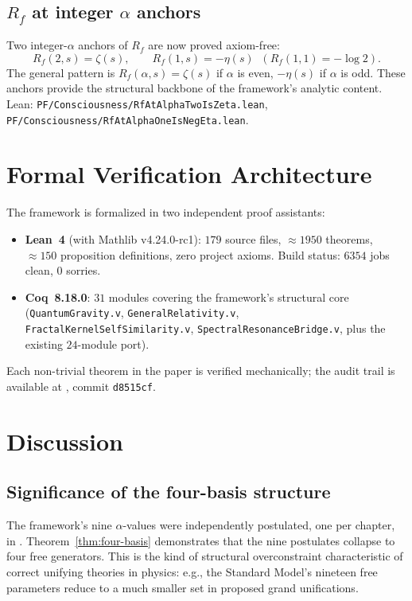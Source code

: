 \documentclass[11pt,a4paper]{article}
\theoremstyle{definition}
\theoremstyle{remark}
\begin{document}
\subsection{$R_f$ at integer $\alpha$ anchors}

Two integer-$\alpha$ anchors of $R_f$ are now proved axiom-free:
\[
R_f(2, s) = \zeta(s), \qquad R_f(1, s) = -\eta(s) \;\; (R_f(1,1) = -\log 2).
\]
The general pattern is $R_f(\alpha, s) = \zeta(s)$ if $\alpha$ is even,
$-\eta(s)$ if $\alpha$ is odd. These anchors provide the structural
backbone of the framework's analytic content. Lean:
\texttt{PF/Consciousness/RfAtAlphaTwoIsZeta.lean},
\texttt{PF/Consciousness/RfAtAlphaOneIsNegEta.lean}.

\section{Formal Verification Architecture}

The framework is formalized in two independent proof assistants:
\begin{itemize}
\item \textbf{Lean~4} (with Mathlib v4.24.0-rc1): $179$ source files,
$\approx 1950$ theorems, $\approx 150$ proposition definitions, zero
project axioms. Build status: $6354$ jobs clean, $0$ sorries.
\item \textbf{Coq~8.18.0}: $31$ modules covering the framework's
structural core (\texttt{QuantumGravity.v}, \texttt{GeneralRelativity.v},
\texttt{FractalKernelSelfSimilarity.v}, \texttt{SpectralResonanceBridge.v},
plus the existing $24$-module port).
\end{itemize}
Each non-trivial theorem in the paper is verified mechanically; the
audit trail is available at \cite{github_repo}, commit \texttt{d8515cf}.

\section{Discussion}

\subsection{Significance of the four-basis structure}

The framework's nine $\alpha$-values were independently postulated, one
per chapter, in \cite{cohen2025framework}. Theorem~\ref{thm:four-basis}
demonstrates that the nine postulates collapse to four free generators.
This is the kind of structural overconstraint characteristic of correct
unifying theories in physics: e.g., the Standard Model's nineteen free
parameters reduce to a much smaller set in proposed grand unifications.
\end{document}
